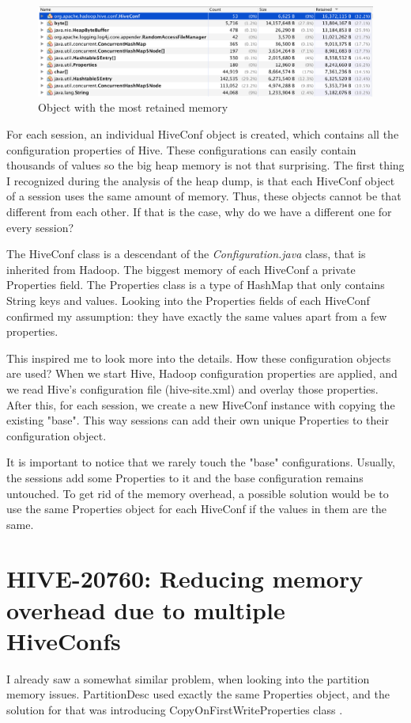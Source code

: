 \begin{figure}[H]
	\includegraphics[width=150mm, keepaspectratio]{figures/hiveconf_memory.png}
	\centering
	\caption{Object with the most retained memory}
\end{figure}

For each session, an individual HiveConf object is created, which contains all the configuration properties of Hive. These configurations can easily contain thousands of values so the big heap memory is not that surprising. The first thing I recognized during the analysis of the heap dump, is that each HiveConf object of a session uses the same amount of memory. Thus, these objects cannot be that different from each other. If that is the case, why do we have a different one for every session?

The HiveConf class is a descendant of the \textit{Configuration.java} class, that is inherited from Hadoop. The biggest memory of each HiveConf a private Properties field. The Properties class is a type of HashMap that only contains String keys and values. Looking into the Properties fields of each HiveConf confirmed my assumption: they have exactly the same values apart from a few properties.

This inspired me to look more into the details. How these configuration objects are used? When we start Hive, Hadoop configuration properties are applied, and we read Hive's configuration file (hive-site.xml) and overlay those properties. After this, for each session, we create a new HiveConf instance with copying the existing "base". This way sessions can add their own unique Properties to their configuration object. 

It is important to notice that we rarely touch the "base" configurations. Usually, the sessions add some Properties to it and the base configuration remains untouched. To get rid of the memory overhead, a possible solution would be to use the same Properties object for each HiveConf if the values in them are the same.

\section{HIVE-20760: Reducing memory overhead due to multiple HiveConfs}
I already saw a somewhat similar problem, when looking into the partition memory issues. PartitionDesc used exactly the same Properties object, and the solution for that was introducing CopyOnFirstWriteProperties class \cite{hive-partitions}. 

